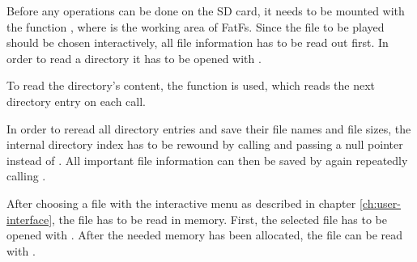 Before any operations can be done on the SD card, it needs to be mounted with the function  , where  is the working area of FatFs. Since the file to be played should be chosen interactively, all file information has to be read out first. In order to read a directory it has to be opened with .

To read the directory's content, the function  is used, which reads the next directory entry on each call. %

In order to reread all directory entries and save their file names and file sizes, the internal directory index has to be rewound by calling  and passing a null pointer instead of . All important file information can then be saved by again repeatedly calling . 

After choosing a file with the interactive menu as described in chapter \ref{ch:user-interface}, the file has to be read in memory. First, the selected file has to be opened with . After the needed memory has been allocated, the file can be read with .
